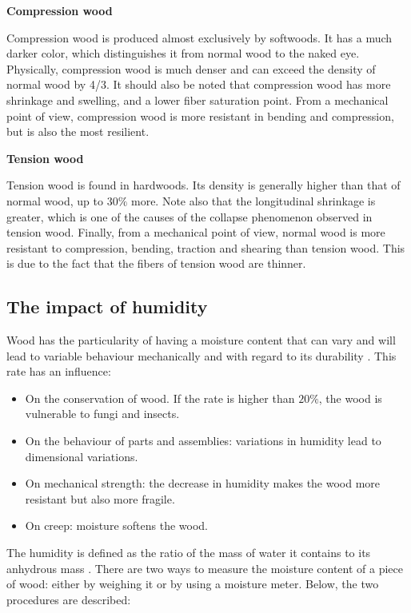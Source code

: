 \smallskip

\textbf{Compression wood}

Compression wood is produced almost exclusively by softwoods. It has a much darker color, which distinguishes it from normal wood to the naked eye. Physically, compression wood is much denser and can exceed the density of normal wood by 4/3. It should also be noted that compression wood has more shrinkage and swelling, and a lower fiber saturation point. From a mechanical point of view, compression wood is more resistant in bending and compression, but is also the most resilient.

\smallskip

\textbf{Tension wood}

Tension wood is found in hardwoods. Its density is generally higher than that of normal wood, up to $30 \%$ more. Note also that the longitudinal shrinkage is greater, which is one of the causes of the collapse phenomenon observed in tension wood. Finally, from a mechanical point of view, normal wood is more resistant to compression, bending, traction and shearing than tension wood. This is due to the fact that the fibers of tension wood are thinner.

\subsection{The impact of humidity}

Wood has the particularity of having a moisture content that can vary and will lead to variable behaviour mechanically and with regard to its durability \citep{Taazount2021}. This rate has an influence:

\begin{itemize}
	\item On the conservation of wood. If the rate is higher than $20 \%$, the wood is vulnerable to fungi and insects.
	\item On the behaviour of parts and assemblies: variations in humidity lead to dimensional variations.
	\item On mechanical strength: the decrease in humidity makes the wood more resistant but also more fragile.
	\item On creep: moisture softens the wood.
\end{itemize}

The humidity is defined as the ratio of the mass of water it contains to its anhydrous mass \citep{Nguyen2016phd}. There are two ways to measure the moisture content of a piece of wood: either by weighing it or by using a moisture meter. Below, the two procedures are described:


